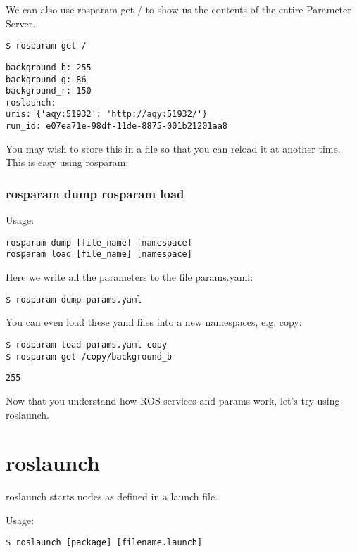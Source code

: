 We can also use rosparam get / to show us the contents of the entire Parameter Server.

\begin{lstlisting}[breaklines=true languages=bash]
$ rosparam get /
\end{lstlisting}

\begin{lstlisting}[breaklines=true languages=bash]
background_b: 255
background_g: 86
background_r: 150
roslaunch:
uris: {'aqy:51932': 'http://aqy:51932/'}
run_id: e07ea71e-98df-11de-8875-001b21201aa8
\end{lstlisting}

You may wish to store this in a file so that you can reload it at another time. This is easy using rosparam:

\subsubsection{rosparam dump rosparam load}
Usage:

\begin{lstlisting}[breaklines=true languages=bash]
rosparam dump [file_name] [namespace]
rosparam load [file_name] [namespace]
\end{lstlisting}

Here we write all the parameters to the file params.yaml:

\begin{lstlisting}[breaklines=true languages=bash]
$ rosparam dump params.yaml
\end{lstlisting}

You can even load these yaml files into a new namespaces, e.g. copy:
\begin{lstlisting}[breaklines=true languages=bash]
$ rosparam load params.yaml copy
$ rosparam get /copy/background_b
\end{lstlisting}

\begin{lstlisting}
255
\end{lstlisting}

Now that you understand how ROS services and params work, let's try using roslaunch.

\section{roslaunch}
roslaunch starts nodes as defined in a launch file.

Usage:
\begin{lstlisting}[breaklines=true languages=bash]
$ roslaunch [package] [filename.launch]
\end{lstlisting}

